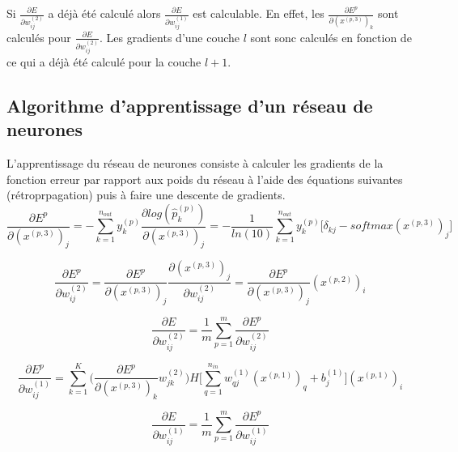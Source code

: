 \documentclass[a4paper,11pt,oneside,roman]{article}
\begin{document}
    Si $\frac{\partial E}{\partial w_{ij}^{(2)}}$ a déjà été calculé alors $\frac{\partial E}{\partial w_{ij}^{(1)}}$ est calculable. En effet, les $\frac{\partial E^p}{\partial (x^{(p,3)})_k}$ sont calculés pour $\frac{\partial E}{\partial w_{ij}^{(2)}}$.
    Les gradients d'une couche $l$ sont sonc calculés en fonction de ce qui a déjà été calculé pour la couche $l+1$.

    \subsection{Algorithme d'apprentissage d'un réseau de neurones}

    L'apprentissage du réseau de neurones consiste à calculer les gradients de la fonction erreur par rapport aux poids du réseau à l'aide des équations suivantes (rétroprpagation) puis à faire une descente de gradients.
    \begin{equation}
        \frac{\partial E^p}{\partial (x^{(p,3)})_{j}} = -\sum\limits_{k=1}^{n_{out}} y_k^{(p)} \frac{\partial log(\hat{p}_{k}^{(p)})}{\partial (x^{(p,3)})_{j}} = - \frac{1}{ln(10)} \sum\limits_{k=1}^{n_{out}} y_k^{(p)} \bigg[ \delta_{kj} - softmax(x^{(p,3)})_j \bigg]
    \end{equation}

    \begin{equation}
        \frac{\partial E^p}{\partial w_{ij}^{(2)}} = \frac{\partial E^p}{\partial (x^{(p,3)})_{j}} \frac{\partial (x^{(p,3)})_{j}}{\partial w_{ij}^{(2)}} = \frac{\partial E^p}{\partial (x^{(p,3)})_{j}} (x^{(p,2)})_i
    \end{equation}

    \begin{equation}
        \frac{\partial E}{\partial w_{ij}^{(2)}} = \frac{1}{m} \sum\limits_{p=1}^{m} \frac{\partial E^p}{\partial w_{ij}^{(2)}}
    \end{equation}

    \begin{equation}
        \frac{\partial E^p}{\partial w_{ij}^{(1)}} = \sum\limits_{k=1}^{K} \Big(\frac{\partial E^p}{\partial (x^{(p,3)})_k} w_{jk}^{(2)}\Big) H\big[\sum\limits_{q=1}^{n_{in}} w_{qj}^{(1)}(x^{(p,1)})_{q} + b_j^{(1)}\big] (x^{(p,1)})_i
    \end{equation}

    \begin{equation}
        \frac{\partial E}{\partial w_{ij}^{(1)}} = \frac{1}{m}\sum\limits_{p=1}^{m}\frac{\partial E^p}{\partial w_{ij}^{(1)}}
    \end{equation}
\end{document}
